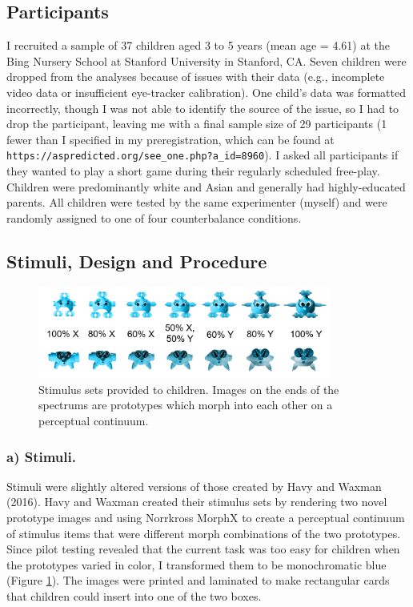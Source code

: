 \documentclass[floatsintext,man]{apa6}
\theoremstyle{definition}
\theoremstyle{definition}
\theoremstyle{definition}
\theoremstyle{remark}
\begin{document}
\subsection{Participants}\label{participants}

I recruited a sample of 37 children aged 3 to 5 years (mean age = 4.61)
at the Bing Nursery School at Stanford University in Stanford, CA. Seven
children were dropped from the analyses because of issues with their
data (e.g., incomplete video data or insufficient eye-tracker
calibration). One child's data was formatted incorrectly, though I was
not able to identify the source of the issue, so I had to drop the
participant, leaving me with a final sample size of 29 participants (1
fewer than I specified in my preregistration, which can be found at
\texttt{https://aspredicted.org/see\_one.php?a\_id=8960}). I asked all
participants if they wanted to play a short game during their regularly
scheduled free-play. Children were predominantly white and Asian and
generally had highly-educated parents. All children were tested by the
same experimenter (myself) and were randomly assigned to one of four
counterbalance conditions.

\subsection{Stimuli, Design and
Procedure}\label{stimuli-design-and-procedure}

\begin{figure}

{\centering \includegraphics[width=3.8in]{../images/stimuli_1} 

}

\caption{Stimulus sets provided to children. Images on the ends of the spectrums are prototypes which morph into each other on a perceptual continuum.}\label{fig:stimuli}
\end{figure}

\subsubsection{a) Stimuli.}\label{a-stimuli.}

Stimuli were slightly altered versions of those created by Havy and
Waxman (2016). Havy and Waxman created their stimulus sets by rendering
two novel prototype images and using Norrkross MorphX to create a
perceptual continuum of stimulus items that were different morph
combinations of the two prototypes. Since pilot testing revealed that
the current task was too easy for children when the prototypes varied in
color, I transformed them to be monochromatic blue (Figure
\ref{fig:stimuli}). The images were printed and laminated to make
rectangular cards that children could insert into one of the two boxes.
\end{document}
